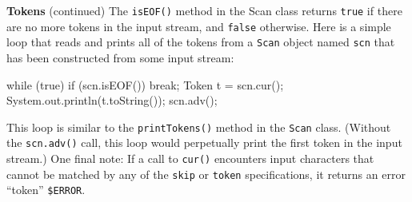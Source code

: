 \begin{minipage}[t]{\sw}
\slidenumber
\LARGE
{\bf Tokens} (continued)\exx
The \verb'isEOF()' method in the Scan class returns \verb'true'
if there are no more tokens in the input stream,
and \verb'false' otherwise.\exx
Here is a simple loop that reads and prints all of the tokens
from a \verb'Scan' object named \verb'scn'
that has been constructed from some input stream:
\begin{qv}
while (true) {
  if (scn.isEOF())
    break;
  Token t = scn.cur();
  System.out.println(t.toString());
  scn.adv();
}
\end{qv}
This loop is similar to the \verb'printTokens()' method
in the \verb'Scan' class.
(Without the \verb'scn.adv()' call,
this loop would perpetually print the first token
in the input stream.)\exx
One final note:
If a call to \verb'cur()' encounters input characters
that cannot be matched by any
of the \verb'skip' or \verb'token' specifications,
it returns an error ``token'' \verb'$ERROR'.

\end{minipage}
